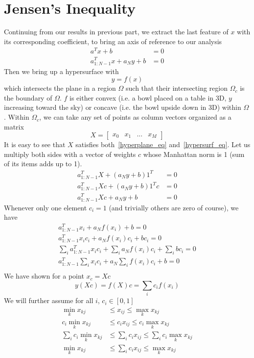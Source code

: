 \documentclass{book}
\numberwithin{equation}{subsection}
\begin{document}
\section{Jensen's Inequality}
Continuing from our results in previous part, we extract the last feature of $x$ with its corresponding coefficient, to bring an axis of reference to our analysis
\begin{align}
    a^Tx+b &= 0\\
    a_{1:N-1}^Tx+a_Ny+b &= 0 \label{hyperplane_eq}
\end{align}
Then we bring up a hypersurface with
\begin{equation}
    y=f(x) \label{hypersurf_eq}
\end{equation}
which intersects the plane in a region $\Omega$ such that their intersecting region $\Omega_c$ is the boundary of $\Omega$. $f$ is either convex (i.e. a bowl placed on a table in 3D, $y$ increasing toward the sky) or concave (i.e. the bowl upside down in 3D) within $\Omega$. Within $\Omega_c$, we can take any set of points as column vectors organized as a matrix
$$
X = \begin{bmatrix}
    x_0 & x_1 & ... & x_M
\end{bmatrix}
$$
It is easy to see that $X$ satisfies both~\ref{hyperplane_eq} and~\ref{hypersurf_eq}. Let us multiply both sides with a vector of weights $c$ whose Manhattan norm is 1 (sum of its items adds up to 1).
\begin{align}
    a_{1:N-1}^TX+(a_Ny+b)1^T &= 0\\
    a_{1:N-1}^TXc+(a_Ny+b)1^Tc &= 0\\
    a_{1:N-1}^TXc+a_Ny+b &= 0
\end{align}
Whenever only one element $c_i=1$ (and trivially others are zero of course), we have
\begin{align}
    a_{1:N-1}^Tx_i+a_Nf(x_i)+b = 0\\
    a_{1:N-1}^Tx_ic_i+a_Nf(x_i)c_i+bc_i = 0\\
    \sum_i a_{1:N-1}^Tx_ic_i+\sum_i a_Nf(x_i)c_i+\sum_i bc_i = 0\\
    a_{1:N-1}^T\sum_i x_ic_i+a_N\sum_i f(x_i)c_i+b = 0\\
\end{align}
We have shown for a point $x_c=Xc$
\begin{equation}
    y(Xc)=f(X)c=\sum_i c_if(x_i)
\end{equation}
We will further assume for all $i$, $c_i \in [0,1]$
\begin{align}
    \min_kx_{kj} &\leq x_{ij} \leq \max_kx_{kj}\\
    c_i\min_kx_{kj} &\leq c_ix_{ij} \leq c_i\max_kx_{kj}\\
    \sum_i c_i\min_kx_{kj} &\leq \sum_i c_ix_{ij} \leq \sum_i c_i\max_kx_{kj}\\
    \min_kx_{kj} &\leq \sum_i c_ix_{ij} \leq \max_kx_{kj}\\
\end{align}
\end{document}
